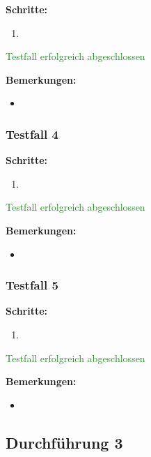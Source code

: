 \textbf{Schritte:}

\begin{enumerate}
    \item 
\end{enumerate}

\textcolor{ForestGreen}{Testfall erfolgreich abgeschlossen}

\bigskip
\textbf{Bemerkungen:}

\begin{itemize}[noitemsep,nolistsep]
    \item 
\end{itemize}


\subsubsection*{Testfall 4}

\textbf{Schritte:}

\begin{enumerate}
    \item 
\end{enumerate}

\textcolor{ForestGreen}{Testfall erfolgreich abgeschlossen}

\bigskip
\textbf{Bemerkungen:}

\begin{itemize}[noitemsep,nolistsep]
    \item 
\end{itemize}

\subsubsection*{Testfall 5}

\textbf{Schritte:}

\begin{enumerate}
    \item 
\end{enumerate}

\textcolor{ForestGreen}{Testfall erfolgreich abgeschlossen}

\bigskip
\textbf{Bemerkungen:}

\begin{itemize}[noitemsep,nolistsep]
    \item 
\end{itemize}



\subsection*{Durchführung 3}



